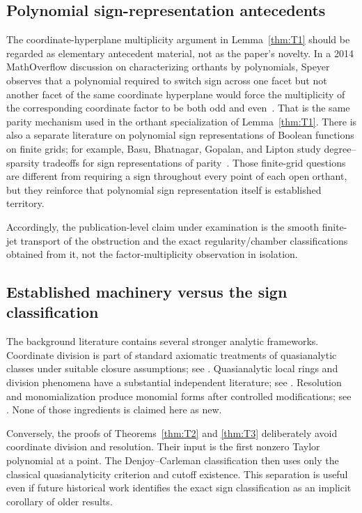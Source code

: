 \documentclass[11pt]{article}
\theoremstyle{definition}
\theoremstyle{remark}
\begin{document}
\subsection{Polynomial sign-representation antecedents}

The coordinate-hyperplane multiplicity argument in Lemma~\ref{thm:T1} should be regarded as elementary antecedent material, not as the paper's novelty. In a 2014 MathOverflow discussion on characterizing orthants by polynomials, Speyer observes that a polynomial required to switch sign across one facet but not another facet of the same coordinate hyperplane would force the multiplicity of the corresponding coordinate factor to be both odd and even~\cite{MathOverflow2014}. That is the same parity mechanism used in the orthant specialization of Lemma~\ref{thm:T1}. There is also a separate literature on polynomial sign representations of Boolean functions on finite grids; for example, Basu, Bhatnagar, Gopalan, and Lipton study degree--sparsity tradeoffs for sign representations of parity~\cite{BasuEtAl2008}. Those finite-grid questions are different from requiring a sign throughout every point of each open orthant, but they reinforce that polynomial sign representation itself is established territory.

Accordingly, the publication-level claim under examination is the smooth finite-jet transport of the obstruction and the exact regularity/chamber classifications obtained from it, not the factor-multiplicity observation in isolation.

\subsection{Established machinery versus the sign classification}

The background literature contains several stronger analytic frameworks. Coordinate division is part of standard axiomatic treatments of quasianalytic classes under suitable closure assumptions; see \cite{BelottoBierstoneChow2018}. Quasianalytic local rings and division phenomena have a substantial independent literature; see \cite{Thilliez2008}. Resolution and monomialization produce monomial forms after controlled modifications; see \cite{BierstoneMilman2004,BelottoBierstone2023}. None of those ingredients is claimed here as new.

Conversely, the proofs of Theorems~\ref{thm:T2} and \ref{thm:T3} deliberately avoid coordinate division and resolution. Their input is the first nonzero Taylor polynomial at a point. The Denjoy--Carleman classification then uses only the classical quasianalyticity criterion and cutoff existence. This separation is useful even if future historical work identifies the exact sign classification as an implicit corollary of older results.
\end{document}
